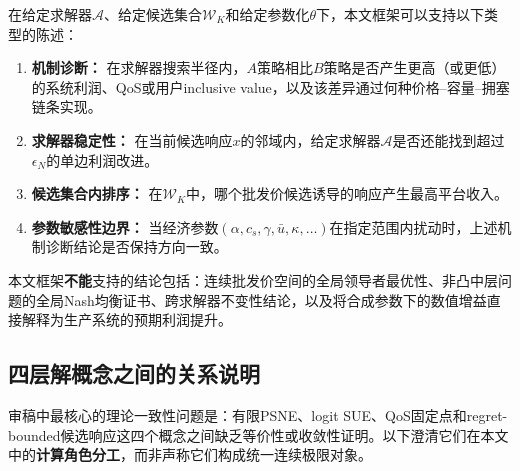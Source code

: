 \documentclass[UTF8,11pt]{ctexart}
\begin{document}
在给定求解器$\mathcal{A}$、给定候选集合$\mathcal{W}_K$和给定参数化$\theta$下，本文框架可以支持以下类型的陈述：
\begin{enumerate}[leftmargin=2em]
  \item \textbf{机制诊断：} 在求解器搜索半径内，$A$策略相比$B$策略是否产生更高（或更低）的系统利润、QoS或用户inclusive value，以及该差异通过何种价格--容量--拥塞链条实现。
  \item \textbf{求解器稳定性：} 在当前候选响应$x$的邻域内，给定求解器$\mathcal{A}$是否还能找到超过$\epsilon_N$的单边利润改进。
  \item \textbf{候选集合内排序：} 在$\mathcal{W}_K$中，哪个批发价候选诱导的响应产生最高平台收入。
  \item \textbf{参数敏感性边界：} 当经济参数$(\alpha,c_s,\gamma,\bar u,\kappa,\ldots)$在指定范围内扰动时，上述机制诊断结论是否保持方向一致。
\end{enumerate}
本文框架\textbf{不能}支持的结论包括：连续批发价空间的全局领导者最优性、非凸中层问题的全局Nash均衡证书、跨求解器不变性结论，以及将合成参数下的数值增益直接解释为生产系统的预期利润提升。

\subsection{四层解概念之间的关系说明}

审稿中最核心的理论一致性问题是：有限PSNE、logit SUE、QoS固定点和regret-bounded候选响应这四个概念之间缺乏等价性或收敛性证明。以下澄清它们在本文中的\textbf{计算角色分工}，而非声称它们构成统一连续极限对象。
\end{document}

